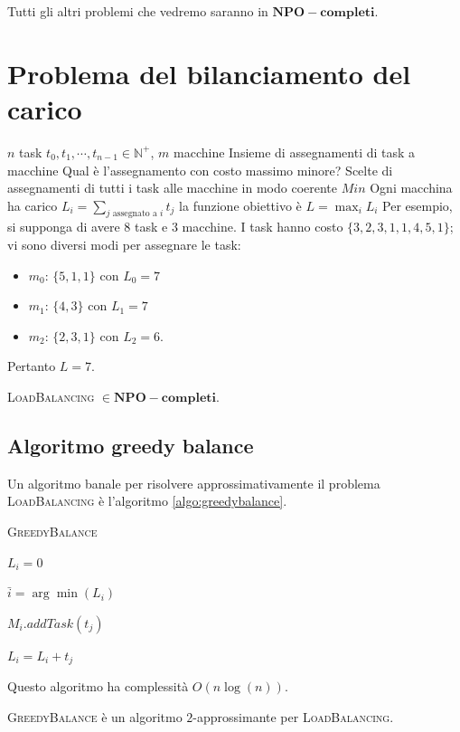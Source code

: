 \noindent
Tutti gli altri problemi che vedremo saranno in $\mathbf{NPO-completi}$.
\vfill

\section{Problema del bilanciamento del carico}
 {$n$ task $t_0, t_1, \cdots, t_{n-1} \in \mathbb{N}^+$, $m$ macchine}
{Insieme di assegnamenti di task a macchine}
{Qual è l'assegnamento con costo massimo minore?}
{Scelte di assegnamenti di tutti i task alle macchine in modo coerente}
{$Min$}
{Ogni macchina ha carico $L_i = \sum_{j \text{ assegnato a } i } t_j$
    la funzione obiettivo è $L=\max_i L_i$}
Per esempio, si supponga di avere $8$ task e $3$ macchine. I task hanno costo
$\{3, 2, 3, 1, 1, 4, 5, 1\}$; vi sono diversi modi per assegnare le task:
\begin{itemize}
	\item{$m_0$}: $\{5, 1,1\}$ con $L_0 = 7$
	\item{$m_1$}: $\{4, 3\}$ con $L_1 = 7$
	\item{$m_2$}: $\{2, 3, 1\}$ con $L_2 = 6$.
\end{itemize}
Pertanto $L = 7$.

\begin{theorem}
	\textsc{LoadBalancing} $ \in \mathbf{NPO-completi}$.
\end{theorem}

\subsection{Algoritmo greedy balance}
Un algoritmo banale per risolvere approssimativamente il problema \textsc{LoadBalancing} è
l'algoritmo \ref{algo:greedybalance}.

\begin{algorithm}[!ht]
	\caption{\textsc{GreedyBalance}}
	\label{algo:greedybalance}

	{
		$L_i = 0$
	}

	{
		$ \bar{i} = \arg \min (L_i)$

		$M_i.addTask(t_j)$

		$L_i = L_i + t_j$
	}

\end{algorithm}
\noindent
Questo algoritmo ha complessità $O(n \log(n))$.

\begin{theorem} \label{thm:gbal_2_approx}
	\textsc{GreedyBalance} è un algoritmo $2$-approssimante per \textsc{LoadBalancing}.
\end{theorem}

